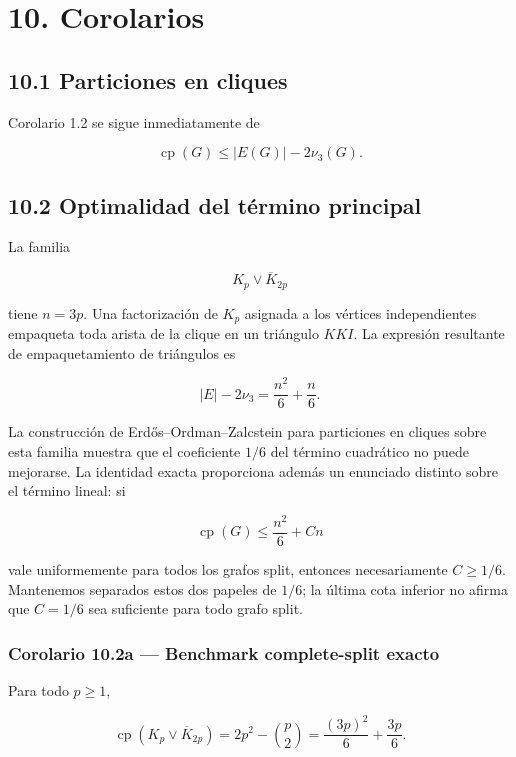 \documentclass[
  spanish,
  11pt,
  a4paper,
]{article}
\begin{document}
\section{10. Corolarios}\label{corolarios}

\subsection{10.1 Particiones en cliques}\label{particiones-en-cliques}

Corolario 1.2 se sigue inmediatamente de

\[
\operatorname{cp}(G)
\le
|E(G)|-2\nu_3(G).
\]

\subsection{10.2 Optimalidad del término principal}\label{optimalidad-del-tuxe9rmino-principal}

La familia

\[
K_p\vee\overline K_{2p}
\]

tiene \(n=3p\). Una factorización de \(K_p\) asignada a los vértices independientes empaqueta toda arista de la clique en un triángulo \(KKI\). La expresión resultante de empaquetamiento de triángulos es

\[
|E|-2\nu_3
=
\frac{n^2}{6}+\frac n6.
\tag{10.1}
\]

La construcción de Erdős--Ordman--Zalcstein para particiones en cliques sobre esta familia muestra que el coeficiente \(1/6\) del término cuadrático no puede mejorarse. La identidad exacta proporciona además un enunciado distinto sobre el término lineal: si

\[
\operatorname{cp}(G)\le \frac{n^2}{6}+Cn
\]

vale uniformemente para todos los grafos split, entonces necesariamente \(C\ge1/6\). Mantenemos separados estos dos papeles de \(1/6\); la última cota inferior no afirma que \(C=1/6\) sea suficiente para todo grafo split.

\subsubsection{Corolario 10.2a --- Benchmark complete-split exacto}\label{corolario-10.2a-benchmark-complete-split-exacto}

Para todo \(p\ge1\),

\[
\operatorname{cp}\!\left(K_p\vee\overline K_{2p}\right)
=
2p^2-\binom p2
=
\frac{(3p)^2}{6}+\frac{3p}{6}.
\tag{10.1a}
\]
\end{document}
